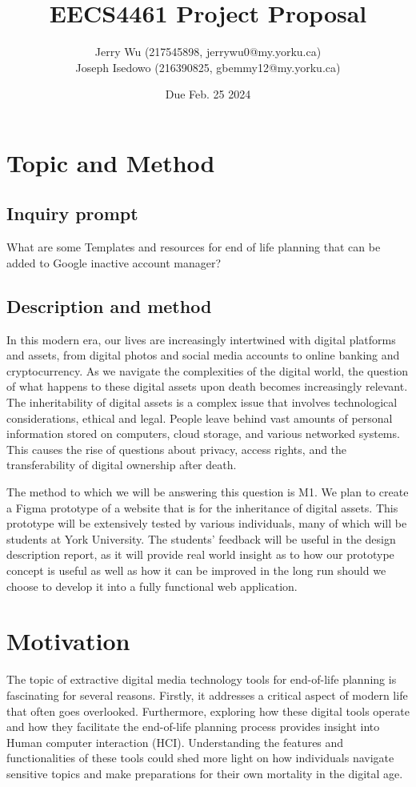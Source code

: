 \documentclass[12pt]{article}
\title{EECS4461 Project Proposal}
\author{
    Jerry Wu (217545898, jerrywu0@my.yorku.ca)\\
    Joseph Isedowo  (216390825, gbemmy12@my.yorku.ca)
}
\date{Due Feb. 25 2024}
\begin{document}
\maketitle

\section*{Topic and Method}
\subsection*{Inquiry prompt }    
 What are some Templates and resources for end of life planning that can be added to Google inactive account manager?

\subsection*{Description and method}
In this modern era, our lives are increasingly intertwined with digital platforms and assets, from digital photos and social media accounts to online banking and cryptocurrency. As we navigate the complexities of the digital world, the question of what happens to these digital assets upon death becomes increasingly relevant. The inheritability of digital assets is a complex issue that involves technological considerations, ethical and legal. People leave behind vast amounts of personal information stored on computers, cloud storage, and various networked systems. This causes the rise of questions about privacy, access rights, and the transferability of digital ownership after death. 

The method to which we will be answering this question is M1. We plan to create a Figma prototype of a website that is for the inheritance of digital assets. This prototype will be extensively tested by various individuals, many of which will be students at York University. The students' feedback will be useful in the design description report, as it will provide real world insight as to how our prototype concept is useful as well as how it can be improved in the long run should we choose to develop it into a fully functional web application.

\section*{Motivation}

The topic of extractive digital media technology tools for end-of-life planning is fascinating for several reasons. Firstly, it addresses a critical aspect of modern life that often goes overlooked. Furthermore, exploring how these digital tools operate and how they facilitate the end-of-life planning process provides insight into Human computer interaction (HCI). Understanding the features and functionalities of these tools could shed more light on how individuals navigate sensitive topics and make preparations for their own mortality in the digital age. 
\end{document}
